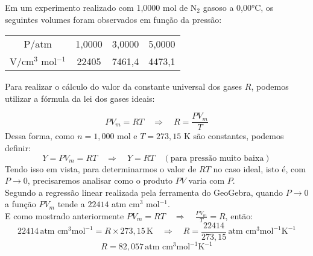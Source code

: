 \begin{xcs}
    Em um experimento realizado com 1,0000 mol de N\(_2\) gasoso a 0,00°C, os
    seguintes volumes foram observados em função da pressão: 
    \begin{center}
    \begin{tabular}{c | c c c}
    \hline
        P/atm & 1,0000 & 3,0000 & 5,0000\\
        V/cm\(^3\) mol\(^{-1}\) & 22405 & 7461,4 & 4473,1\\
    \hline
    \end{tabular}
    \end{center}
\end{xcs}
\begin{rsl}


    Para realizar o cálculo do valor da constante universal dos gases \( R \),
    podemos utilizar a fórmula da lei dos gases ideais: 
    
    \[ PV_m = RT \quad \Rightarrow \quad R = \frac{PV_m}{T} \]
    Dessa forma, como \( n = 1,000 \) mol e \( T = 273,15 \) K são constantes, podemos definir:
    \[Y = PV_m = RT \quad \Rightarrow \quad Y = RT \quad (\text{para pressão muito baixa})\]
    Tendo isso em vista, para determinarmos o valor de \( RT \) no caso ideal, 
    isto é, com \( P \to 0 \), precisaremos analisar como o produto \( PV \) varia com \( P \). \\
    Segundo a regressão linear realizada pela ferramenta do GeoGebra, quando \( P \to 0 \) a função \( PV_m \) tende a \( 22414 \) atm cm\(^3\) mol\(^{-1}\). \\
    E como mostrado anteriormente \( PV_m = RT \quad \Rightarrow \quad \frac{PV_m}{T} = R \), então:
    \[22414 \, \text{atm cm}^3 \text{mol}^{-1} = R \times 273,15 \, \text{K} \quad \Rightarrow \quad R = \frac{22414}{273,15} \, \text{atm cm}^3 \text{mol}^{-1} \text{K}^{-1}\]
    \[R = 82,057 \, \text{atm cm}^3 \text{mol}^{-1} \text{K}^{-1}\]

\end{rsl}

